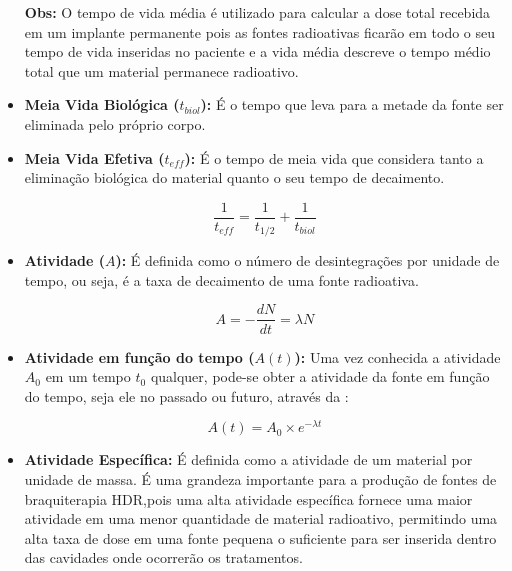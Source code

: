 \documentclass[11pt,a4paper]{article}
\begin{document}
\begin{itemize}
				\textbf{\textcolor{CarnationPink}{Obs:}} O tempo de vida média é utilizado para calcular a dose total recebida em um implante permanente pois as fontes radioativas ficarão em todo o seu tempo de vida inseridas no paciente e a vida média descreve o tempo médio total que um material permanece radioativo.

			\item \textbf{Meia Vida Biológica ($t_{biol}$):} É o tempo que leva para a metade da fonte ser eliminada pelo próprio corpo.
			
			\item \textbf{Meia Vida Efetiva ($t_{eff}$): } É o tempo de meia vida que considera tanto a eliminação biológica do material quanto o seu tempo de decaimento.
			
				\begin{equation}
					\frac{1}{t_{eff}} = \frac{1}{t_{1/2}} + \frac{1}{t_{biol}}
				\end{equation}

			\item \textbf{Atividade ($A$): } É definida como o número de desintegrações por unidade de tempo, ou seja, é a taxa de decaimento de uma fonte radioativa. 
				
				\begin{equation}
					A = -\frac{dN}{dt} = \lambda N
				\end{equation}

			\item \textbf{Atividade em função do tempo ($A(t)$): } Uma vez conhecida a atividade $A_0$ em um tempo $t_0$ qualquer, pode-se obter a atividade da fonte em função do tempo, seja ele no passado ou futuro, através da  :
				
				\begin{equation}
					A(t) = A_0 \times e^{-\lambda t}
					\label{eq:AtividadeNoTempo}
				\end{equation}

			\item \textbf{Atividade Específica: } É definida como a atividade de um material por unidade de massa. É uma grandeza importante para a produção de fontes de braquiterapia HDR,pois uma alta atividade específica fornece uma maior atividade em uma menor quantidade de material radioativo, permitindo uma alta taxa de dose em uma fonte pequena o suficiente para ser inserida dentro das cavidades onde ocorrerão os tratamentos.

		\end{itemize}
\end{document}
